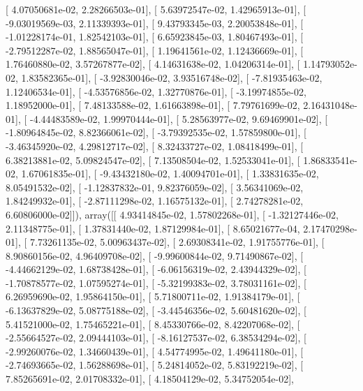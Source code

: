 \documentclass{article}
\begin{document}
       [  4.07050681e-02,   2.28266503e-01],
       [  5.63972547e-02,   1.42965913e-01],
       [ -9.03019569e-03,   2.11339393e-01],
       [  9.43793345e-03,   2.20053848e-01],
       [ -1.01228174e-01,   1.82542103e-01],
       [  6.65923845e-03,   1.80467493e-01],
       [ -2.79512287e-02,   1.88565047e-01],
       [  1.19641561e-02,   1.12436669e-01],
       [  1.76460880e-02,   3.57267877e-02],
       [  4.14631638e-02,   1.04206314e-01],
       [  1.14793052e-02,   1.83582365e-01],
       [ -3.92830046e-02,   3.93516748e-02],
       [ -7.81935463e-02,   1.12406534e-01],
       [ -4.53576856e-02,   1.32770876e-01],
       [ -3.19974855e-02,   1.18952000e-01],
       [  7.48133588e-02,   1.61663898e-01],
       [  7.79761699e-02,   2.16431048e-01],
       [ -4.44483589e-02,   1.99970444e-01],
       [  5.28563977e-02,   9.69469901e-02],
       [ -1.80964845e-02,   8.82366061e-02],
       [ -3.79392535e-02,   1.57859800e-01],
       [ -3.46345920e-02,   4.29812717e-02],
       [  8.32433727e-02,   1.08418499e-01],
       [  6.38213881e-02,   5.09824547e-02],
       [  7.13508504e-02,   1.52533041e-01],
       [  1.86833541e-02,   1.67061835e-01],
       [ -9.43432180e-02,   1.40094701e-01],
       [  1.33831635e-02,   8.05491532e-02],
       [ -1.12837832e-01,   9.82376059e-02],
       [  3.56341069e-02,   1.84249932e-01],
       [ -2.87111298e-02,   1.16575132e-01],
       [  2.74278281e-02,   6.60806000e-02]]), array([[  4.93414845e-02,   1.57802268e-01],
       [ -1.32127446e-02,   2.11348775e-01],
       [  1.37831440e-02,   1.87129984e-01],
       [  8.65021677e-04,   2.17470298e-01],
       [  7.73261135e-02,   5.00963437e-02],
       [  2.69308341e-02,   1.91755776e-01],
       [  8.90860156e-02,   4.96409708e-02],
       [ -9.99600844e-02,   9.71490867e-02],
       [ -4.44662129e-02,   1.68738428e-01],
       [ -6.06156319e-02,   2.43944329e-02],
       [ -1.70878577e-02,   1.07595274e-01],
       [ -5.32199383e-02,   3.78031161e-02],
       [  6.26959690e-02,   1.95864150e-01],
       [  5.71800711e-02,   1.91384179e-01],
       [ -6.13637829e-02,   5.08775188e-02],
       [ -3.44546356e-02,   5.60481620e-02],
       [  5.41521000e-02,   1.75465221e-01],
       [  8.45330766e-02,   8.42207068e-02],
       [ -2.55664527e-02,   2.09444103e-01],
       [ -8.16127537e-02,   6.38534294e-02],
       [ -2.99260076e-02,   1.34660439e-01],
       [  4.54774995e-02,   1.49641180e-01],
       [ -2.74693665e-02,   1.56288698e-01],
       [  5.24814052e-02,   5.83192219e-02],
       [  7.85265691e-02,   2.01708332e-01],
       [  4.18504129e-02,   5.34752054e-02],
\end{document}
